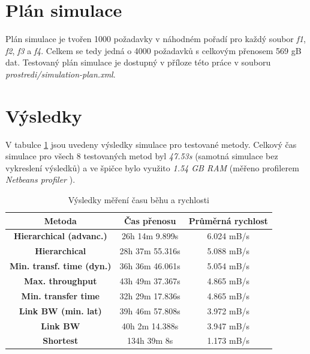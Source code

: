 \documentclass[czech,DP]{thesiskiv}
\begin{document}
\section{Plán simulace}

Plán simulace je tvořen 1000 požadavky v náhodném pořadí pro každý soubor \textit{f1}, \textit{f2}, \textit{f3} a \textit{f4}. Celkem se tedy jedná o 4000 požadavků s celkovým přenosem 569 gB dat. Testovaný plán simulace je dostupný v příloze této práce v souboru \textit{prostredi/simulation-plan.xml}.

\section{Výsledky} 

V tabulce \ref{table:test_vysledky} jsou uvedeny výsledky simulace pro testované metody. Celkový čas simulace pro všech 8 testovaných metod byl \textit{47.53s} (samotná simulace bez vykreslení výsledků) a ve špičce bylo využito \textit{1.54 GB RAM} (měřeno profilerem \textit{Netbeans profiler} \cite{netbeansprofileronline}).

\begin{table}[]
\centering
\caption{Výsledky měření času běhu a rychlosti}
\label{table:test_vysledky}
\begin{tabular}{c|cc}
\hline
\textbf{Metoda}                   & \textbf{Čas přenosu} & \textbf{Průměrná rychlost} \\ \hline
\hline
\rowcolor{HoneyDew}
\textbf{Hierarchical (advanc.)}   & 26h 14m 9.899s     & 6.024 mB/s                 \\ \hline
\textbf{Hierarchical}             & 28h 37m 55.316s     & 5.088 mB/s                 \\ \hline
\textbf{Min. transf. time (dyn.)} & 36h 36m 46.061s     & 5.054 mB/s                  \\ \hline
\textbf{Max. throughput}          & 43h 49m 37.367s     & 4.865 mB/s                 \\ \hline
\textbf{Min. transfer time}       & 32h 29m 17.836s     & 4.865 mB/s                  \\ \hline
\textbf{Link BW (min. lat)}       & 39h 46m 57.808s     & 3.972 mB/s                  \\ \hline
\textbf{Link BW}                  & 40h 2m 14.388s     & 3.947 mB/s                  \\ \hline
\textbf{Shortest}                 & 134h 39m 8s         & 1.173 mB/s                 \\ \hline
\end{tabular}\end{table}
\end{document}
